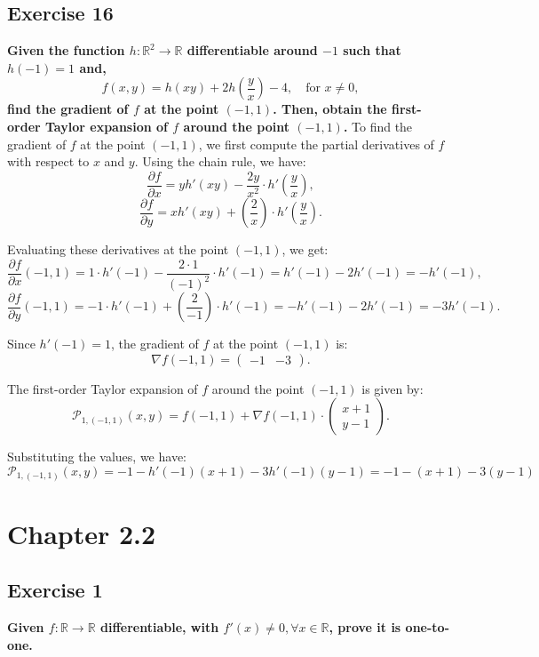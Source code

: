 \documentclass[11pt]{article}
\begin{document}
\pagebreak

\subsection*{Exercise 16}
\textbf{Given the function \(h : \mathbb{R}^2 \to \mathbb{R}\) differentiable around \(-1\) such that \(h(-1) = 1\) and, }
\[f(x, y) = h(xy) + 2h\left(\frac{y}{x}\right) - 4, \quad \text{for } x \neq 0,\]
\textbf{find the gradient of \(f\) at the point \((-1, 1)\). Then, obtain the first-order Taylor expansion of \(f\) around the point \((-1, 1)\).}
\vskip 0.5cm
To find the gradient of \(f\) at the point \((-1, 1)\), we first compute the partial derivatives of \(f\) with respect to \(x\) and \(y\). Using the chain rule, we have:
\[\frac{\partial f}{\partial x} = y h'(xy) - \frac{2y}{x^2} \cdot h'\left(\frac{y}{x}\right),\]
\[\frac{\partial f}{\partial y} = x h'(xy) + \left(\frac{2}{x}\right) \cdot h'\left(\frac{y}{x}\right).\]

Evaluating these derivatives at the point \((-1, 1)\), we get:
\[\frac{\partial f}{\partial x}(-1, 1) = 1 \cdot h'(-1) - \frac{2 \cdot 1}{(-1)^2} \cdot h'(-1) = h'(-1) - 2h'(-1) = -h'(-1),\]
\[\frac{\partial f}{\partial y}(-1, 1) = -1 \cdot h'(-1) + \left(\frac{2}{-1}\right) \cdot h'(-1) = -h'(-1) - 2h'(-1) = -3h'(-1).\]

Since \(h'(-1) = 1\), the gradient of \(f\) at the point \((-1, 1)\) is:
\[\nabla f(-1, 1) = \begin{pmatrix} -1 & -3 \end{pmatrix}.\]

The first-order Taylor expansion of \(f\) around the point \((-1, 1)\) is given by:
\[\mathcal{P}_{1, (-1, 1)}(x, y) = f(-1, 1) + \nabla f(-1, 1) \cdot \begin{pmatrix} x + 1 \\ y - 1 \end{pmatrix}.\]

Substituting the values, we have:
\[\mathcal{P}_{1, (-1, 1)}(x, y) = -1 - h'(-1)(x + 1) - 3h'(-1)(y - 1) = -1 - (x + 1) - 3(y - 1)\]
\pagebreak
\section*{Chapter 2.2}
\subsection*{Exercise 1}
\textbf{Given \(f : \mathbb{R} \to \mathbb{R}\) differentiable, with \(f'(x) \neq 0, \forall x \in \mathbb{R}\), prove it is one-to-one.}
\vskip 0.5cm
\end{document}
